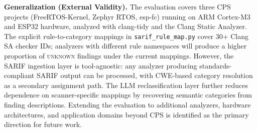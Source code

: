 \textbf{Generalization (External Validity).}
The evaluation covers three CPS projects (FreeRTOS-Kernel, Zephyr RTOS, esp-fc) running on ARM Cortex-M3 and ESP32 hardware, analyzed with clang-tidy and the Clang Static Analyzer. The explicit rule-to-category mappings in \texttt{sarif\_rule\_map.py} cover 30+ Clang SA checker IDs; analyzers with different rule namespaces will produce a higher proportion of \textsc{unknown} findings under the current mappings. However, the SARIF ingestion layer is tool-agnostic: any analyzer producing standards-compliant SARIF output can be processed, with CWE-based category resolution as a secondary assignment path. The LLM reclassification layer further reduces dependence on scanner-specific mappings by recovering semantic categories from finding descriptions. Extending the evaluation to additional analyzers, hardware architectures, and application domains beyond CPS is identified as the primary direction for future work.